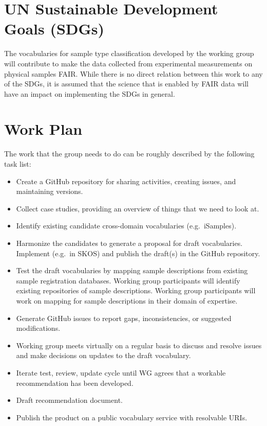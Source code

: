 \documentclass{scrartcl}
\begin{document}
\section{UN Sustainable Development Goals (SDGs)}

The vocabularies for sample type classification developed by the
working group will contribute to make the data collected from
experimental measurements on physical samples FAIR.  While there is no
direct relation between this work to any of the SDGs, it is assumed
that the science that is enabled by FAIR data will have an impact on
implementing the SDGs in general.

\section{Work Plan}

The work that the group needs to do can be roughly described by the
following task list:
\begin{itemize}
\item Create a GitHub repository for sharing activities, creating
  issues, and maintaining versions.
\item Collect case studies, providing an overview of things that we need
  to look at.
\item Identify existing candidate cross-domain vocabularies
  (e.g.\ iSamples).
\item Harmonize the candidates to generate a proposal for draft
  vocabularies.  Implement (e.g.\ in SKOS) and publish the draft(s) in
  the GitHub repository.
\item Test the draft vocabularies by mapping sample descriptions from
  existing sample registration databases.  Working group participants
  will identify existing repositories of sample descriptions.  Working
  group participants will work on mapping for sample descriptions in
  their domain of expertise.
\item Generate GitHub issues to report gaps, inconsistencies, or
  suggested modifications.
\item Working group meets virtually on a regular basis to discuss and
  resolve issues and make decisions on updates to the draft
  vocabulary.
\item Iterate test, review, update cycle until WG agrees that a
  workable recommendation has been developed.
\item Draft recommendation document.
\item Publish the product on a public vocabulary service with
  resolvable URIs.
\end{itemize}
\end{document}
